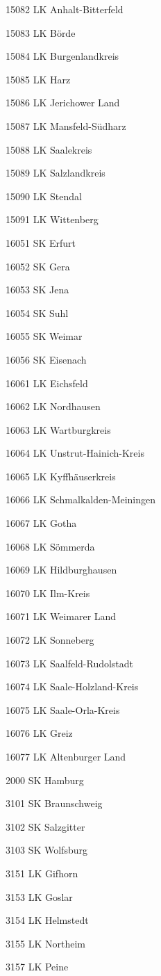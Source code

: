 15082  LK Anhalt-Bitterfeld

15083  LK Börde

15084  LK Burgenlandkreis

15085  LK Harz

15086  LK Jerichower Land

15087  LK Mansfeld-Südharz

15088  LK Saalekreis

15089  LK Salzlandkreis

15090  LK Stendal

15091  LK Wittenberg

16051  SK Erfurt

16052  SK Gera

16053  SK Jena

16054  SK Suhl

16055  SK Weimar

16056  SK Eisenach

16061  LK Eichsfeld

16062  LK Nordhausen

16063  LK Wartburgkreis

16064  LK Unstrut-Hainich-Kreis

16065  LK Kyffhäuserkreis

16066  LK Schmalkalden-Meiningen

16067  LK Gotha

16068  LK Sömmerda

16069  LK Hildburghausen

16070  LK Ilm-Kreis

16071  LK Weimarer Land

16072  LK Sonneberg

16073  LK Saalfeld-Rudolstadt

16074  LK Saale-Holzland-Kreis

16075  LK Saale-Orla-Kreis

16076  LK Greiz

16077  LK Altenburger Land

2000  SK Hamburg

3101  SK Braunschweig

3102  SK Salzgitter

3103  SK Wolfsburg

3151  LK Gifhorn

3153  LK Goslar

3154  LK Helmstedt

3155  LK Northeim

3157  LK Peine


